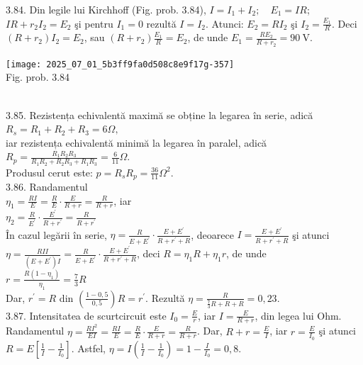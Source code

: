 3.84. Din legile lui Kirchhoff (Fig. prob. 3.84), $I=I_{1}+I_{2} ; \quad E_{1}=I R$; $I R+r_{2} I_{2}=E_{2}$ şi pentru $I_{1}=0$ rezultă $I=I_{2}$. Atunci: $E_{2}=R I_{2}$ şi $I_{2}=\frac{E_{1}}{R}$. Deci $\left(R+r_{2}\right) I_{2}=E_{2}$, sau $\left(R+r_{2}\right) \frac{E_{1}}{R}=E_{2}$, de unde $E_{1}=\frac{R E_{2}}{R+r_{2}}=90 \mathrm{~V}$.\\ \begin{center} \texttt{[image: 2025\_07\_01\_5b3ff9fa0d508c8e9f17g-357]}\\ Fig. prob. 3.84 \end{center}\\

3.85. Rezistența echivalentă maximă se obține la legarea în serie, adică\\ $R_{s}=R_{1}+R_{2}+R_{3}=6 \Omega,$\\ iar rezistența echivalentă minimă la legarea în paralel, adică\\ $R_{p}=\frac{R_{1} R_{2} R_{3}}{R_{1} R_{2}+R_{2} R_{3}+R_{1} R_{3}}=\frac{6}{11} \Omega .$\\ Produsul cerut este: $p=R_{s} R_{p}=\frac{36}{11} \Omega^{2}$.\\

3.86. Randamentul \\ $\eta_{1}=\frac{R I}{E}=\frac{R}{E} \cdot \frac{E}{R+r}=\frac{R}{R+r}$, iar\\ $\eta_{2}=\frac{R}{E^{\prime}} \cdot \frac{E^{\prime}}{R+r^{\prime}}=\frac{R}{R+r^{\prime}}$\\ În cazul legării în serie, $\eta=\frac{R}{E+E^{\prime}} \cdot \frac{E+E^{\prime}}{R+r^{\prime}+R}$, deoarece $I=\frac{E+E^{\prime}}{R+r^{\prime}+R}$ şi atunci $\eta=\frac{R I I}{\left(E+E^{\prime}\right) I}=\frac{R}{E+E^{\prime}} \cdot \frac{E+E^{\prime}}{R+r^{\prime}+R}$, deci $R=\eta_{1} R+\eta_{1} r$, de unde\\ $r=\frac{R\left(1-\eta_{1}\right)}{\eta_{1}}=\frac{7}{3} R$\\ Dar, $r^{\prime}=R$ din $\left(\frac{1-0,5}{0,5}\right) R=r^{\prime}$. Rezultă $\eta=\frac{R}{\frac{7}{3} R+R+R}=0,23$.\\

3.87. Intensitatea de scurtcircuit este $I_{0}=\frac{E}{r}$, iar $I=\frac{E}{R+r}$, din legea lui Ohm. Randamentul $\eta=\frac{R I^{2}}{E I}=\frac{R I}{E}=\frac{R}{E} \cdot \frac{E}{R+r}=\frac{R}{R+r}$. Dar, $R+r=\frac{E}{I}$, iar $r=\frac{E}{I_{0}}$ şi atunci $R=E\left[\frac{1}{I}-\frac{1}{I_{0}}\right]$. Astfel, $\eta=I\left(\frac{1}{I}-\frac{1}{I_{0}}\right)=1-\frac{I}{I_{0}}=0,8$.\\


